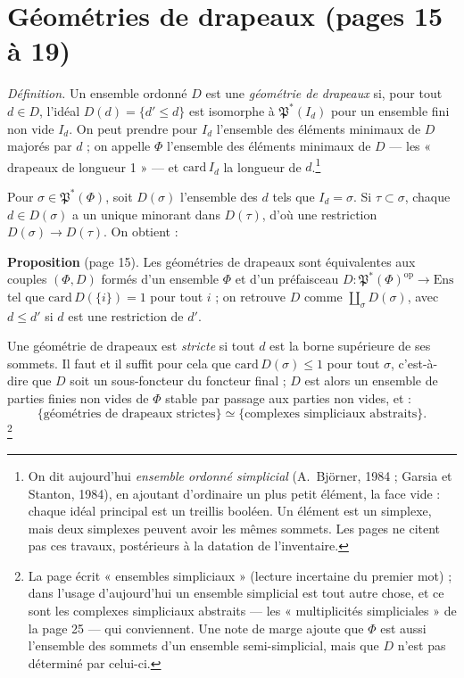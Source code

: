 \documentclass[11pt,a4paper]{article}
\begin{document}
\section*{Géométries de drapeaux (pages 15 à 19)}

\emph{Définition.} Un ensemble ordonné $D$ est une \emph{géométrie de
drapeaux} si, pour tout $d \in D$, l'idéal $D(d) = \{d' \leqslant d\}$ est
isomorphe à $\mathfrak{P}^*(I_d)$ pour un ensemble fini non vide $I_d$. On
peut prendre pour $I_d$ l'ensemble des éléments minimaux de $D$ majorés par
$d$ ; on appelle $\Phi$ l'ensemble des éléments minimaux de $D$ --- les
« drapeaux de longueur 1 » --- et $\mathrm{card}\, I_d$ la longueur de
$d$.\footnote{On dit aujourd'hui \emph{ensemble ordonné simplicial}
(A.~Björner, 1984 ; Garsia et Stanton, 1984), en ajoutant d'ordinaire un plus
petit élément, la face vide : chaque idéal principal est un treillis
booléen. Un élément est un simplexe, mais deux simplexes peuvent avoir les
mêmes sommets. Les pages ne citent pas ces travaux, postérieurs à la
datation de l'inventaire.}

Pour $\sigma \in \mathfrak{P}^*(\Phi)$, soit $D(\sigma)$ l'ensemble des $d$
tels que $I_d = \sigma$. Si $\tau \subset \sigma$, chaque $d \in D(\sigma)$ a
un unique minorant dans $D(\tau)$, d'où une restriction $D(\sigma) \to
D(\tau)$. On obtient :

\textbf{Proposition} (page 15). Les géométries de drapeaux sont
équivalentes aux couples $(\Phi, D)$ formés d'un ensemble $\Phi$ et d'un
préfaisceau $D : \mathfrak{P}^*(\Phi)^{\mathrm{op}} \to \mathrm{Ens}$ tel que
$\mathrm{card}\, D(\{i\}) = 1$ pour tout $i$ ; on retrouve $D$ comme
$\coprod_\sigma D(\sigma)$, avec $d \leqslant d'$ si $d$ est une restriction
de $d'$.

Une géométrie de drapeaux est \emph{stricte} si tout $d$ est la borne
supérieure de ses sommets. Il faut et il suffit pour cela que $\mathrm{card}\,
D(\sigma) \leqslant 1$ pour tout $\sigma$, c'est-à-dire que $D$ soit un
sous-foncteur du foncteur final ; $D$ est alors un ensemble de parties finies
non vides de $\Phi$ stable par passage aux parties non vides, et :
\[
  \{\text{géométries de drapeaux strictes}\} \simeq
  \{\text{complexes simpliciaux abstraits}\} .
\]
\footnote{La page écrit « ensembles simpliciaux » (lecture incertaine du
premier mot) ; dans l'usage d'aujourd'hui un ensemble simplicial est tout
autre chose, et ce sont les complexes simpliciaux abstraits --- les
« multiplicités simpliciales » de la page 25 --- qui conviennent. Une note de
marge ajoute que $\Phi$ est aussi l'ensemble des sommets d'un ensemble
semi-simplicial, mais que $D$ n'est pas déterminé par celui-ci.}
\end{document}

